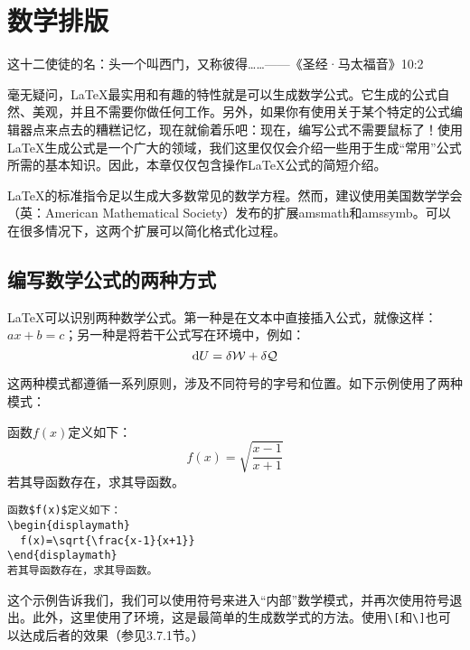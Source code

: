 \chapter{数学排版}

这十二使徒的名：头一个叫西门，又称彼得……——《圣经·马太福音》10:2

毫无疑问，\LaTeX 最实用和有趣的特性就是可以生成数学公式。它生成的公式自然、美观，并且不需要你做任何工作。另外，如果你有使用关于某个特定的公式编辑器点来点去的糟糕记忆，现在就偷着乐吧：现在，编写公式不需要鼠标了！使用\LaTeX 生成公式是一个广大的领域，我们这里仅仅会介绍一些用于生成“常用”公式所需的基本知识。因此，本章仅仅包含操作\LaTeX 公式的简短介绍。

\begin{ii}
\LaTeX 的标准指令足以生成大多数常见的数学方程。然而，建议使用美国数学学会（英：American Mathematical Society）发布的扩展amsmath和amssymb。可以在很多情况下，这两个扩展可以简化格式化过程。
\end{ii}

\section{编写数学公式的两种方式}

\LaTeX 可以识别两种数学公式。第一种是在文本中直接插入公式，就像这样：$ax+b=c$；另一种是将若干公式写在环境中，例如：
$$
{\rm d} U = \delta \mathcal{W} +\delta \mathcal{Q} 
$$

这两种模式都遵循一系列原则，涉及不同符号的字号和位置。如下示例使用了两种模式：

\begin{codelist}[3.1]{
  函数$f(x)$定义如下：
\begin{displaymath}
  f(x)=\sqrt{\frac{x-1}{x+1}}
\end{displaymath}
若其导函数存在，求其导函数。
}\begin{verbatim}
函数$f(x)$定义如下：
\begin{displaymath}
  f(x)=\sqrt{\frac{x-1}{x+1}}
\end{displaymath}
若其导函数存在，求其导函数。
\end{verbatim}
\end{codelist}

这个示例告诉我们，我们可以使用\dm{\$}符号来进入“内部”数学模式，并再次使用\dm{\$}符号退出。此外，这里使用了环境，这是最简单的生成数学式的方法。使用\verb|\[|和\verb|\]|也可以达成后者的效果（参见3.7.1节。）

